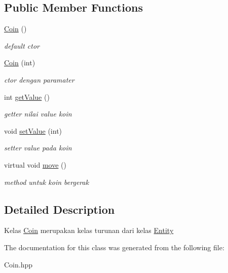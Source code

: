 \subsection*{Public Member Functions}
\begin{DoxyCompactItemize}
\item 
\mbox{\label{classCoin_a94b2130e2d3ac956ba47271ad81c64f5}} 
\hyperlink{classCoin_a94b2130e2d3ac956ba47271ad81c64f5}{Coin} ()
\begin{DoxyCompactList}\small\item\em default ctor \end{DoxyCompactList}\item 
\mbox{\label{classCoin_aa6bd6ccd1fe41c519112b077e54a603a}} 
\hyperlink{classCoin_aa6bd6ccd1fe41c519112b077e54a603a}{Coin} (int)
\begin{DoxyCompactList}\small\item\em ctor dengan paramater \end{DoxyCompactList}\item 
\mbox{\label{classCoin_a1e51e734f8cbd7366e4376d9e3439d9e}} 
int \hyperlink{classCoin_a1e51e734f8cbd7366e4376d9e3439d9e}{get\+Value} ()
\begin{DoxyCompactList}\small\item\em getter nilai value koin \end{DoxyCompactList}\item 
\mbox{\label{classCoin_a000679bc7222f8ee0c0be74e920005a1}} 
void \hyperlink{classCoin_a000679bc7222f8ee0c0be74e920005a1}{set\+Value} (int)
\begin{DoxyCompactList}\small\item\em setter value pada koin \end{DoxyCompactList}\item 
\mbox{\label{classCoin_a152d094662ff9b2ed44af94f11241856}} 
virtual void \hyperlink{classCoin_a152d094662ff9b2ed44af94f11241856}{move} ()
\begin{DoxyCompactList}\small\item\em method untuk koin bergerak \end{DoxyCompactList}\end{DoxyCompactItemize}


\subsection{Detailed Description}
Kelas \hyperlink{classCoin}{Coin} merupakan kelas turunan dari kelas \hyperlink{classEntity}{Entity} 

The documentation for this class was generated from the following file\+:\begin{DoxyCompactItemize}
\item 
Coin.\+hpp\end{DoxyCompactItemize}
